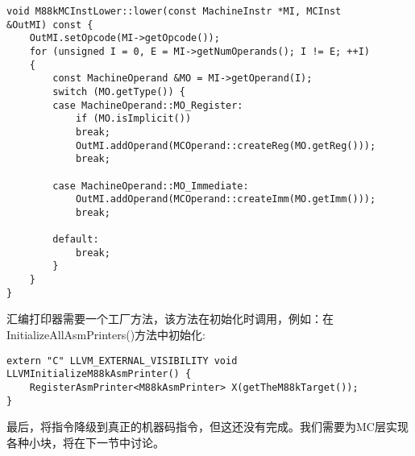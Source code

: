 \begin{lstlisting}[caption={}]
void M88kMCInstLower::lower(const MachineInstr *MI, MCInst
&OutMI) const {
	OutMI.setOpcode(MI->getOpcode());
	for (unsigned I = 0, E = MI->getNumOperands(); I != E; ++I)
	{
		const MachineOperand &MO = MI->getOperand(I);
		switch (MO.getType()) {
		case MachineOperand::MO_Register:
			if (MO.isImplicit())
			break;
			OutMI.addOperand(MCOperand::createReg(MO.getReg()));
			break;
			
		case MachineOperand::MO_Immediate:
			OutMI.addOperand(MCOperand::createImm(MO.getImm()));
			break;
			
		default:
			break;
		}
	}
}
\end{lstlisting}

汇编打印器需要一个工厂方法，该方法在初始化时调用，例如：在InitializeAllAsmPrinters()方法中初始化:\par

\begin{lstlisting}[caption={}]
extern "C" LLVM_EXTERNAL_VISIBILITY void
LLVMInitializeM88kAsmPrinter() {
	RegisterAsmPrinter<M88kAsmPrinter> X(getTheM88kTarget());
}
\end{lstlisting}

最后，将指令降级到真正的机器码指令，但这还没有完成。我们需要为MC层实现各种小块，将在下一节中讨论。\par

































